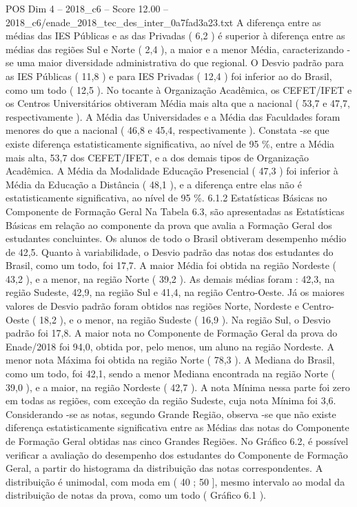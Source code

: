 \begin{textsample}{POS Dim 4 – 2018\_c6 – Score 12.00 – 2018\_c6/enade\_2018\_tec\_des\_inter\_0a7fad3a23.txt}
A diferença entre as médias das IES Públicas e as das Privadas ( 6,2 ) é superior à diferença entre as médias das regiões Sul e Norte ( 2,4 ), a maior e a menor Média, caracterizando -se uma maior diversidade administrativa do que regional.
O Desvio padrão para as IES Públicas ( 11,8 ) e para IES Privadas ( 12,4 ) foi inferior ao do Brasil, como um todo ( 12,5 ).
No tocante à Organização Acadêmica, os CEFET/IFET e os Centros Universitários obtiveram Média mais alta que a nacional ( 53,7 e 47,7, respectivamente ).
A Média das Universidades e a Média das Faculdades foram menores do que a nacional ( 46,8 e 45,4, respectivamente ).
Constata -se que existe diferença estatisticamente significativa, ao nível de 95 \%, entre a Média mais alta, 53,7 dos CEFET/IFET, e a dos demais tipos de Organização Acadêmica.
A Média da Modalidade Educação Presencial ( 47,3 ) foi inferior à Média da Educação a Distância ( 48,1 ), e a diferença entre elas não é estatisticamente significativa, ao nível de 95 \%. 6.1.2 Estatísticas Básicas no Componente de Formação Geral Na Tabela 6.3, são apresentadas as Estatísticas Básicas em relação ao componente da prova que avalia a Formação Geral dos estudantes concluintes.
Os alunos de todo o Brasil obtiveram desempenho médio de 42,5.
Quanto à variabilidade, o Desvio padrão das notas dos estudantes do Brasil, como um todo, foi 17,7.
A maior Média foi obtida na região Nordeste ( 43,2 ), e a menor, na região Norte ( 39,2 ).
As demais médias foram : 42,3, na região Sudeste, 42,9, na região Sul e 41,4, na região Centro-Oeste.
Já os maiores valores de Desvio padrão foram obtidos nas regiões Norte, Nordeste e Centro-Oeste ( 18,2 ), e o menor, na região Sudeste ( 16,9 ).
Na região Sul, o Desvio padrão foi 17,8.
A maior nota no Componente de Formação Geral da prova do Enade/2018 foi 94,0, obtida por, pelo menos, um aluno na região Nordeste.
A menor nota Máxima foi obtida na região Norte ( 78,3 ).
A Mediana do Brasil, como um todo, foi 42,1, sendo a menor Mediana encontrada na região Norte ( 39,0 ), e a maior, na região Nordeste ( 42,7 ).
A nota Mínima nessa parte foi zero em todas as regiões, com exceção da região Sudeste, cuja nota Mínima foi 3,6.
Considerando -se as notas, segundo Grande Região, observa -se que não existe diferença estatisticamente significativa entre as Médias das notas do Componente de Formação Geral obtidas nas cinco Grandes Regiões.
No Gráfico 6.2, é possível verificar a avaliação do desempenho dos estudantes do Componente de Formação Geral, a partir do histograma da distribuição das notas correspondentes.
A distribuição é unimodal, com moda em ( 40 ; 50 ], mesmo intervalo ao modal da distribuição de notas da prova, como um todo ( Gráfico 6.1 ).

\end{textsample}
